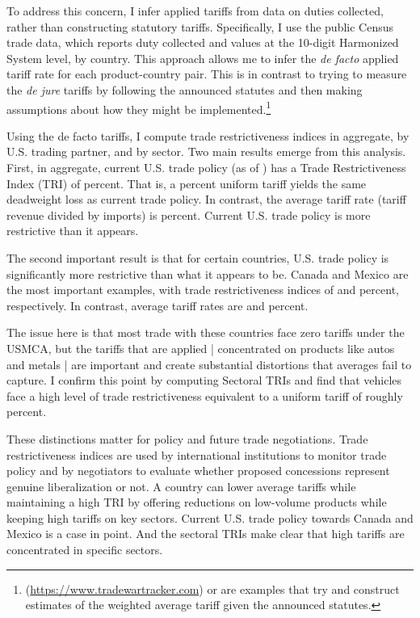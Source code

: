 \documentclass[12pt,pdftex]{article}
\begin{document}
\begin{onehalfspacing}
To address this concern, I infer applied tariffs from data on duties collected, rather than constructing statutory tariffs. Specifically, I use the public Census trade data, which reports duty collected and values at the 10-digit Harmonized System level, by country. This approach allows me to infer the \emph{de facto} applied tariff rate for each product-country pair. This is in contrast to trying to measure the \emph{de jure} tariffs by following the announced statutes and then making assumptions about how they might be implemented.\footnote{\citet{tracker} (\url{https://www.tradewartracker.com}) or \citet{budgetlab2025tariffs} are examples that try and construct estimates of the weighted average tariff given the announced statutes.}

Using the de facto tariffs, I compute trade restrictiveness indices in aggregate, by U.S. trading partner, and by sector. Two main results emerge from this analysis. First, in aggregate, current U.S. trade policy (as of \currentdate{}) has a Trade Restrictiveness Index (TRI) of \rmsValuetwofive{} percent. That is, a \rmsValuetwofive{} percent uniform tariff yields the same deadweight loss as current trade policy. In contrast, the average tariff rate (tariff revenue divided by imports) is \simpleMeanValuetwofive{} percent. Current U.S. trade policy is more restrictive than it appears.

The second important result is that for certain countries, U.S. trade policy is significantly more restrictive than what it appears to be. Canada and Mexico are the most important examples, with trade restrictiveness indices of \canadarmsValuetwofive{} and \mexicormsValuetwofive{} percent, respectively. In contrast, average tariff rates are \canadasimpleMeanValuetwofive{} and \mexicosimpleMeanValuetwofive{} percent.

The issue here is that most trade with these countries face zero tariffs under the USMCA, but the tariffs that are applied | concentrated on products like autos and metals | are important and create substantial distortions that averages fail to capture. I confirm this point by computing Sectoral TRIs and find that vehicles face a high level of trade restrictiveness equivalent to a uniform tariff of roughly \rmsValuetwofiveVehicles{} percent.

These distinctions matter for policy and future trade negotiations. Trade restrictiveness indices are used by international institutions to monitor trade policy and by negotiators to evaluate whether proposed concessions represent genuine liberalization or not. A country can lower average tariffs while maintaining a high TRI by offering reductions on low-volume products while keeping high tariffs on key sectors.  Current U.S. trade policy towards Canada and Mexico is a case in point. And the sectoral TRIs make clear that high tariffs are concentrated in specific sectors.


\end{onehalfspacing}
\end{document}
